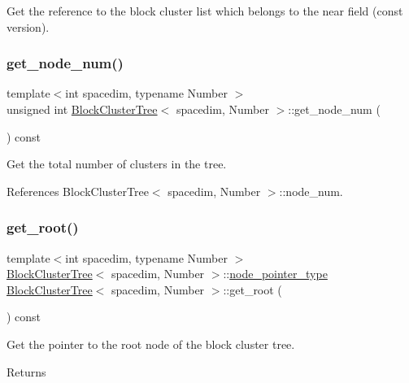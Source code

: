 Get the reference to the block cluster list which belongs to the near field (const version). \mbox{\label{classBlockClusterTree_a042e040d2f6dfcbbfd70b43b8967c6f6}} 
\subsubsection{\texorpdfstring{get\+\_\+node\+\_\+num()}{get\_node\_num()}}
{\footnotesize\ttfamily template$<$int spacedim, typename Number $>$ \\
unsigned int \hyperlink{classBlockClusterTree}{Block\+Cluster\+Tree}$<$ spacedim, Number $>$\+::get\+\_\+node\+\_\+num (\begin{DoxyParamCaption}{ }\end{DoxyParamCaption}) const}

Get the total number of clusters in the tree. 

References Block\+Cluster\+Tree$<$ spacedim, Number $>$\+::node\+\_\+num.

\mbox{\label{classBlockClusterTree_a4a4f3b893380d1d7f53b772589a847d2}} 
\subsubsection{\texorpdfstring{get\+\_\+root()}{get\_root()}}
{\footnotesize\ttfamily template$<$int spacedim, typename Number $>$ \\
\hyperlink{classBlockClusterTree}{Block\+Cluster\+Tree}$<$ spacedim, Number $>$\+::\hyperlink{classTreeNode}{node\+\_\+pointer\+\_\+type} \hyperlink{classBlockClusterTree}{Block\+Cluster\+Tree}$<$ spacedim, Number $>$\+::get\+\_\+root (\begin{DoxyParamCaption}{ }\end{DoxyParamCaption}) const}

Get the pointer to the root node of the block cluster tree. \begin{DoxyReturn}{Returns}

\end{DoxyReturn}


